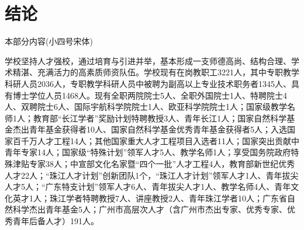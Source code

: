 \section{结论}
本部分内容(小四号宋体)  

 学校坚持人才强校，通过培育与引进并举，基本形成一支师德高尚、结构合理、学术精湛、充满活力的高素质师资队伍。学校现有在岗教职工3221人，其中专职教学科研人员2036人，专职教学科研人员中被聘为副高以上专业技术职务者1345人、具有博士学位人员1468人。现有全职两院院士5人、全职外国院士1人、特聘院士4人、双聘院士6人、国际宇航科学院院士1人、欧亚科学院院士1人；国家级教学名师1人；教育部“长江学者”奖励计划特聘教授3人、青年长江1人；国家自然科学基金杰出青年基金获得者10人、国家自然科学基金优秀青年基金获得者5人；入选国家百千万人才工程14人；其他国家重大人才工程项目入选者11人；国家突出贡献中青年专家14人；国家级“特殊计划”领军人才5人、教学名师1人；享受国务院政府特殊津贴专家38人；中宣部文化名家暨“四个一批”人才工程4人，教育部新世纪优秀人才22人；“珠江人才计划”创新团队1个，“珠江人才计划”领军人才1人、青年拔尖人才5人；“广东特支计划”领军人才6人、青年拔尖人才1人、教学名师4人、青年文化英才1人；珠江学者特聘教授7人、讲座教授2人、青年珠江学者10人；广东省自然科学杰出青年基金5人；广州市高层次人才（含广州市杰出专家、优秀专家、优秀青年后备人才）191人。



